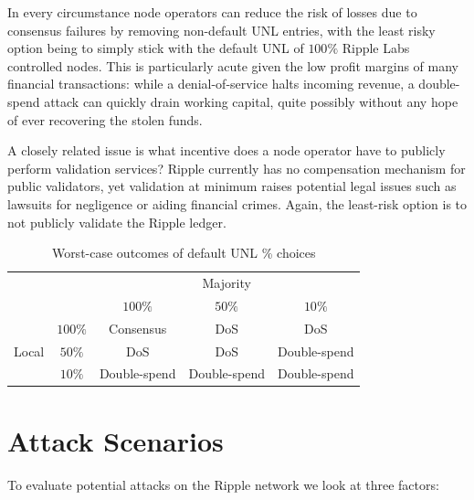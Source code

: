 \documentclass{article}
\begin{document}
In every circumstance node operators can reduce the risk of losses due to
consensus failures by removing non-default UNL entries, with the least risky
option being to simply stick with the default UNL of $100\%$ Ripple Labs
controlled nodes. This is particularly acute given the low profit margins of
many financial transactions: while a denial-of-service halts incoming revenue,
a double-spend attack can quickly drain working capital, quite possibly without
any hope of ever recovering the stolen funds.

A closely related issue is what incentive does a node operator have to publicly
perform validation services? Ripple currently has no compensation mechanism for
public validators, yet validation at minimum raises potential legal issues such
as lawsuits for negligence or aiding financial crimes. Again, the least-risk
option is to not publicly validate the Ripple ledger.

\begin{table}
    \centering

    \begin{tabular}{cc|c|c|c}
        \multicolumn{2}{c}{} & \multicolumn{3}{c}{Majority} \\
        \multicolumn{2}{c}{} & $100\%$ & $50\%$ & $10\%$ \\ \cline{3-5}
        \multirow{3}{*}{Local} & $100\%$ & Consensus & DoS & DoS \\ \cline{2-5}
        ~ & $50\%$ & DoS & DoS & Double-spend \\ \cline{2-5}
        ~ & $10\%$ & Double-spend & Double-spend & Double-spend \\
    \end{tabular}

    \caption{Worst-case outcomes of default UNL \% choices}
    \label{tbl:unl-outcomes}
\end{table}


\section{Attack Scenarios}

To evaluate potential attacks on the Ripple network we look at three factors:
\end{document}
